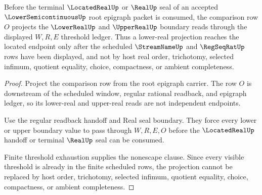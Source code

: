 \begin{theorem}
\label{thm:lower-semicontinuous-root-lowerreal-projection}
Before the terminal $\LocatedRealUp$ or $\RealUp$ seal of an accepted $\LowerSemicontinuousUp$ root epigraph packet is consumed, the comparison row $O$ projects the $\LowerRealUp$ and $\UpperRealUp$ boundary reads through the displayed $W,R,E$ threshold ledger. Thus a lower-real projection reaches the located endpoint only after the scheduled $\StreamNameUp$ and $\RegSeqRatUp$ rows have been displayed, and not by host real order, trichotomy, selected infimum, quotient equality, choice, compactness, or ambient completeness.
\end{theorem}
\begin{proof}
Project the comparison row from the root epigraph carrier. The row $O$ is downstream of the scheduled window, regular rational readback, and epigraph ledger, so its lower-real and upper-real reads are not independent endpoints.

Use the regular readback handoff and Real seal boundary. They force every lower or upper boundary value to pass through $W,R,E,O$ before the $\LocatedRealUp$ handoff or terminal $\RealUp$ seal can be consumed.

Finite threshold exhaustion supplies the nonescape clause. Since every visible threshold is already in the finite scheduled rows, the projection cannot be replaced by host order, trichotomy, selected infimum, quotient equality, choice, compactness, or ambient completeness.
\end{proof}

